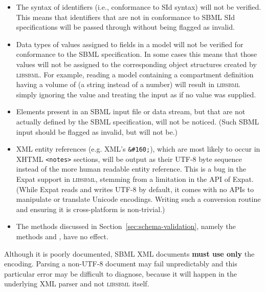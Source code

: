 \documentclass{sbmlmanual}
\newcommand{\libsbml}{\textsc{libsbml}}
\begin{document}
\begin{itemize}

\item The syntax of identifiers (i.e., conformance to SId syntax) will not
  be verified.  This means that identifiers that are not in conformance to
  SBML SId specifications will be passed through without being flagged as
  invalid.

\item Data types of values assigned to fields in a model will not be
  verified for conformance to the SBML specification.  In some cases this
  means that those values will not be assigned to the corresponding object
  structures created by \libsbml{}.  For example, reading a model
  containing a compartment definition having a volume of  (a
  string instead of a number) will result in \libsbml{} simply ignoring the
  value and treating the input as if no value was supplied.

\item Elements present in an SBML input file or data stream, but that are
  not actually defined by the SBML specification, will not be noticed.
  (Such SBML input should be flagged as invalid, but will not be.)
  
\item XML entity references (e.g. XML's \verb|&#160;|), which are most
  likely to occur in XHTML \verb|<notes>| sections, will be output as their
  UTF-8 byte sequence instead of the more human readable entity reference.
  This is a bug in the Expat support in \libsbml{}, stemming from a
  limitation in the API of Expat.  (While Expat reads and writes UTF-8 by
  default, it comes with no APIs to manipulate or translate Unicode
  encodings.  Writing such a conversion routine and ensuring it is
  cross-platform is non-trivial.)
  
\item The methods discussed in Section~\ref{sec:schema-validation}, namely
  the  methods and
  , have no effect.

\end{itemize}


Although it is poorly documented, SBML XML documents \textbf{must use only}
the  encoding.  Parsing a non-UTF-8 document may fail
unpredictably and this particular error may be difficult to diagnose,
because it will happen in the underlying XML parser and not \libsbml{}
itself.
\end{document}
